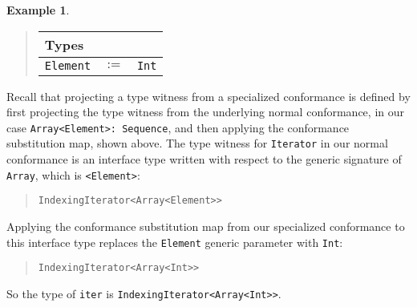 \documentclass[a4paper,headsepline,bibliography=totoc,toc=flat,fleqn,twoside=semi]{scrbook}
\theoremstyle{definition}
\theoremstyle{definition}
\newtheorem{example}{Example}[chapter]
\theoremstyle{definition}
\newcommand{\SubMap}[1]{\begin{tabular}{|lll|}
\hline
\multicolumn{3}{|l|}{\textbf{Types}}\\
\hline
#1\\
\hline
\end{tabular}}
\newcommand{\SubType}[2]{\texttt{#1}&$:=$&\texttt{#2}}
\begin{document}
\begin{example}
\begin{enumerate}
\begin{quote}
\SubMap{\SubType{Element}{Int}}
\end{quote}
Recall that projecting a type witness from a specialized conformance is defined by first projecting the type witness from the underlying normal conformance, in our case \verb|Array<Element>: Sequence|, and then applying the conformance substitution map, shown above. The type witness for \texttt{Iterator} in our normal conformance is an interface type written with respect to the generic signature of \texttt{Array}, which is \verb|<Element>|:
\begin{quote}
\verb|IndexingIterator<Array<Element>>|
\end{quote}
Applying the conformance substitution map from our specialized conformance to this interface type replaces the \texttt{Element} generic parameter with \texttt{Int}:
\begin{quote}
\verb|IndexingIterator<Array<Int>>|
\end{quote}
\end{enumerate}
So the type of \texttt{iter} is \verb|IndexingIterator<Array<Int>>|.
\end{example}
\end{document}
